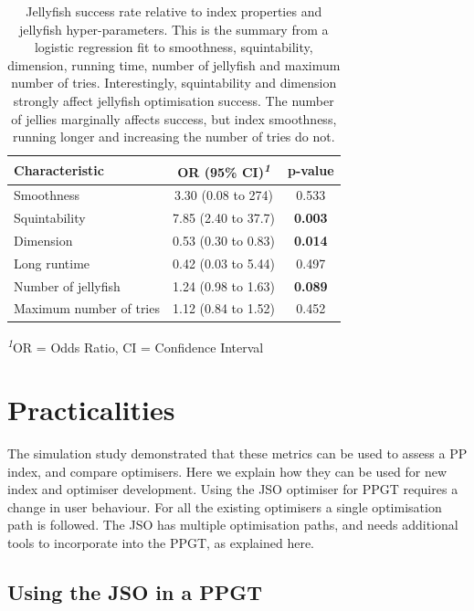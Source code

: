 \documentclass[
  12pt,
]{interact}
\theoremstyle{plain}
\begin{document}
\hypertarget{tbl-mod-output}{}
\begingroup
\fontsize{12.0pt}{14.4pt}\selectfont
\setlength{\LTpost}{0mm}
\begin{longtable}{lcc}
\caption{\label{tbl-mod-output}Jellyfish success rate relative to index properties and jellyfish
hyper-parameters. This is the summary from a logistic regression fit to
smoothness, squintability, dimension, running time, number of jellyfish
and maximum number of tries. Interestingly, squintability and dimension
strongly affect jellyfish optimisation success. The number of jellies
marginally affects success, but index smoothness, running longer and
increasing the number of tries do not. }\tabularnewline

\toprule
\textbf{Characteristic} & \textbf{OR} \textbf{(95\% CI)}\textsuperscript{\textit{1}} & \textbf{p-value} \\ 
\midrule\addlinespace[2.5pt]
Smoothness & 3.30 (0.08 to 274) & 0.533 \\ 
Squintability & 7.85 (2.40 to 37.7) & {\bfseries 0.003} \\ 
Dimension & 0.53 (0.30 to 0.83) & {\bfseries 0.014} \\ 
Long runtime & 0.42 (0.03 to 5.44) & 0.497 \\ 
Number of jellyfish & 1.24 (0.98 to 1.63) & {\bfseries 0.089} \\ 
Maximum number of tries & 1.12 (0.84 to 1.52) & 0.452 \\ 
\bottomrule
\end{longtable}
\begin{minipage}{\linewidth}
\textsuperscript{\textit{1}}OR = Odds Ratio, CI = Confidence Interval\\
\end{minipage}
\endgroup

\hypertarget{sec-discussion}{%
\section{Practicalities}\label{sec-discussion}}

The simulation study demonstrated that these metrics can be used to
assess a PP index, and compare optimisers. Here we explain how they can
be used for new index and optimiser development. Using the JSO optimiser
for PPGT requires a change in user behaviour. For all the existing
optimisers a single optimisation path is followed. The JSO has multiple
optimisation paths, and needs additional tools to incorporate into the
PPGT, as explained here.

\hypertarget{using-the-jso-in-a-ppgt}{%
\subsection{Using the JSO in a PPGT}\label{using-the-jso-in-a-ppgt}}
\end{document}
